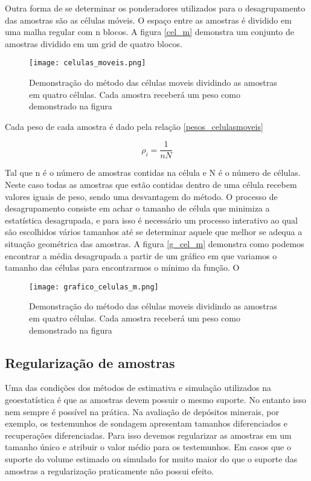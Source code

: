   Outra forma de se determinar os ponderadores utilizados para o desagrupamento das amostras são as células móveis. O espaço entre as amostras é dividido em uma malha regular com n blocos. A figura \eqref{cel_m} demonstra um conjunto de amostras dividido em um grid de quatro blocos.
  
   \begin{figure}[H]
   	\centering
   	\texttt{[image: celulas\_moveis.png]}	
   	\caption{Demonstração do método das células moveis dividindo as amostras em quatro células. Cada amostra receberá um peso como demonstrado na figura}
   	\label{cel_m}
   \end{figure}
  
  
  Cada peso de cada amostra é dado pela relação \eqref{pesos_celulasmoveis}
  
   \begin{equation}\label{pesos_celulasmoveis}
   \rho _{i} = \frac{1}{nN}
   \end{equation}
 
 Tal que n é o número de amostras contidas na célula e N é o número de células. Neste caso todas as amostras que estão contidas dentro de uma célula recebem valores iguais de peso, sendo uma desvantagem do método. O processo de desagrupamento consiste em achar o tamanho de célula que minimiza a estatística desagrupada, e para isso é necessário um processo interativo ao qual são escolhidos vários tamanhos até se determinar aquele que melhor se adequa a situação geométrica das amostras. A figura \eqref{g_cel_m} demonstra como podemos encontrar a média desagrupada a partir de um gráfico em que variamos o tamanho das células para encontrarmos o mínimo da função. O
 
 
\begin{figure}[H]
	\centering
	\texttt{[image: grafico\_celulas\_m.png]}	
	\caption{Demonstração do método das células moveis dividindo as amostras em quatro células. Cada amostra receberá um peso como demonstrado na figura}
	\label{g_cel_m}
\end{figure}
 
\subsection{Regularização de amostras }

Uma das condições dos métodos de estimativa e simulação utilizados na geoestatística é que as amostras devem possuir o mesmo suporte. No entanto isso nem sempre é possível na prática. Na avaliação de depósitos minerais, por exemplo, os testemunhos de sondagem apresentam tamanhos diferenciados e recuperações diferenciadas. Para isso devemos regularizar as amostras em um tamanho único e atribuir o valor médio para os testemunhos. Em casos que o suporte do volume estimado ou simulado for muito maior do que o suporte das amostras a regularização praticamente não possui efeito.

